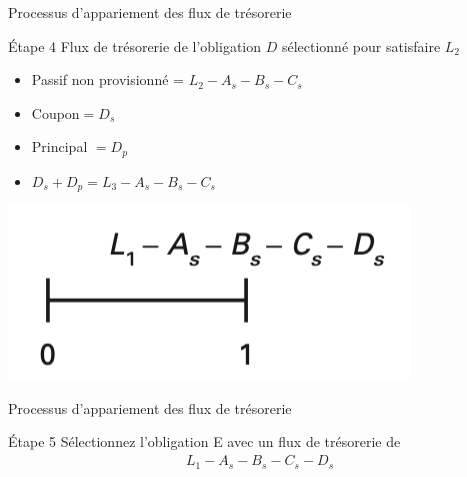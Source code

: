 \documentclass{beamer}
\begin{document}
\begin{frame}{Processus d'appariement des flux de trésorerie}
\begin{block}{Étape 4}
Flux de trésorerie de l'obligation $D$ sélectionné pour satisfaire $L_2$
\begin{itemize}[label=\bullet]
\item Passif non provisionné = $L_2 - A_s-B_s-C_s$
\item Coupon$=D_s$ 
\item Principal $=D_p$
\item $D_s+D_p=L_3 - A_s-B_s-C_s$
\end{itemize}
\end{block}
\includegraphics[scale=.5]{5}
\end{frame}

\begin{frame}{Processus d'appariement des flux de trésorerie}
\begin{block}{Étape 5}
Sélectionnez l'obligation E avec un flux de trésorerie de
\begin{align*}
 L_1 - A_s - B_s - C_s - D_s
\end{align*}
\end{block}

\end{frame}
\end{document}
